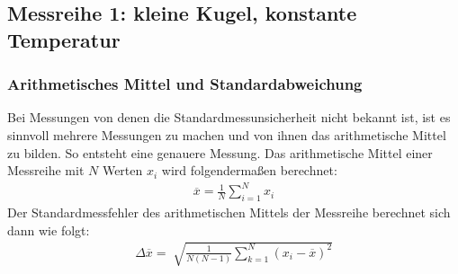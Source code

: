 \subsection{Messreihe 1: kleine Kugel, konstante Temperatur}
\label{sec:auswertung_mr1}
%
\subsubsection[]{Arithmetisches Mittel und Standardabweichung}
Bei Messungen von denen die Standardmessunsicherheit nicht bekannt ist, 
ist es sinnvoll mehrere Messungen zu machen und von ihnen das arithmetische Mittel zu bilden.
So entsteht eine genauere Messung. %
Das arithmetische Mittel einer Messreihe mit $N$ Werten $x_i$ wird folgendermaßen berechnet:
\begin{align}
    \overline{x} = \frac{1}{N} \sum_{i=1}^{N}x_i
    \label{eq:artim_mit}
\end{align}
%
Der Standardmessfehler des arithmetischen Mittels der Messreihe berechnet sich dann wie folgt:
\begin{align}
    \Delta \overline{x} = \sqrt[]{\frac{1}{N \left(N-1\right)} \sum_{k=1}^{N} \left(x_{i} - \overline{x}\right)^2}
    \label{eq:stddev_mit}
\end{align}
%
%
